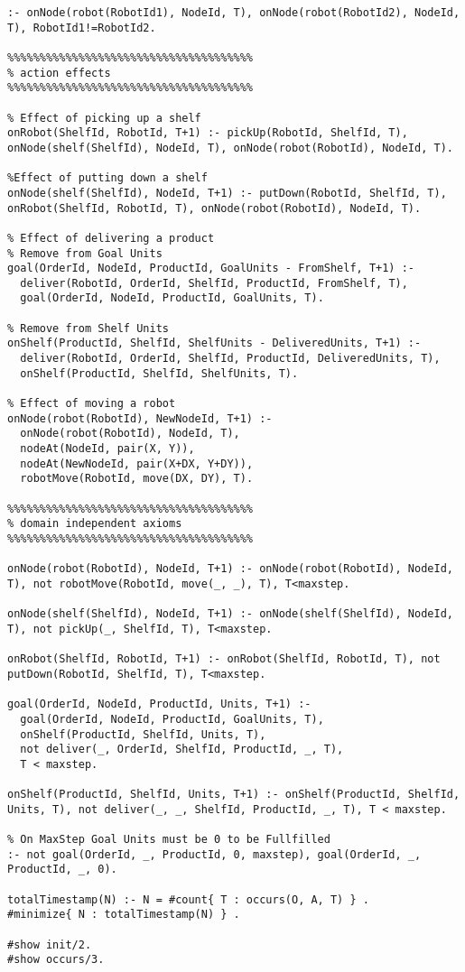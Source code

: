 \documentclass[letterpaper]{article} %
\begin{document}
\begin{lstlisting}[numbers=none,language=clingo]
% No 2 robots on the same node
:- onNode(robot(RobotId1), NodeId, T), onNode(robot(RobotId2), NodeId, T), RobotId1!=RobotId2.

%%%%%%%%%%%%%%%%%%%%%%%%%%%%%%%%%%%%%%
% action effects
%%%%%%%%%%%%%%%%%%%%%%%%%%%%%%%%%%%%%%

% Effect of picking up a shelf
onRobot(ShelfId, RobotId, T+1) :- pickUp(RobotId, ShelfId, T), onNode(shelf(ShelfId), NodeId, T), onNode(robot(RobotId), NodeId, T).

%Effect of putting down a shelf
onNode(shelf(ShelfId), NodeId, T+1) :- putDown(RobotId, ShelfId, T), onRobot(ShelfId, RobotId, T), onNode(robot(RobotId), NodeId, T).

% Effect of delivering a product
% Remove from Goal Units
goal(OrderId, NodeId, ProductId, GoalUnits - FromShelf, T+1) :-
  deliver(RobotId, OrderId, ShelfId, ProductId, FromShelf, T),
  goal(OrderId, NodeId, ProductId, GoalUnits, T).

% Remove from Shelf Units
onShelf(ProductId, ShelfId, ShelfUnits - DeliveredUnits, T+1) :- 
  deliver(RobotId, OrderId, ShelfId, ProductId, DeliveredUnits, T),
  onShelf(ProductId, ShelfId, ShelfUnits, T).

% Effect of moving a robot
onNode(robot(RobotId), NewNodeId, T+1) :-
  onNode(robot(RobotId), NodeId, T),
  nodeAt(NodeId, pair(X, Y)),
  nodeAt(NewNodeId, pair(X+DX, Y+DY)),
  robotMove(RobotId, move(DX, DY), T).

%%%%%%%%%%%%%%%%%%%%%%%%%%%%%%%%%%%%%%
% domain independent axioms
%%%%%%%%%%%%%%%%%%%%%%%%%%%%%%%%%%%%%%

onNode(robot(RobotId), NodeId, T+1) :- onNode(robot(RobotId), NodeId, T), not robotMove(RobotId, move(_, _), T), T<maxstep.

onNode(shelf(ShelfId), NodeId, T+1) :- onNode(shelf(ShelfId), NodeId, T), not pickUp(_, ShelfId, T), T<maxstep.

onRobot(ShelfId, RobotId, T+1) :- onRobot(ShelfId, RobotId, T), not putDown(RobotId, ShelfId, T), T<maxstep.

goal(OrderId, NodeId, ProductId, Units, T+1) :- 
  goal(OrderId, NodeId, ProductId, GoalUnits, T),
  onShelf(ProductId, ShelfId, Units, T),
  not deliver(_, OrderId, ShelfId, ProductId, _, T),
  T < maxstep.

onShelf(ProductId, ShelfId, Units, T+1) :- onShelf(ProductId, ShelfId, Units, T), not deliver(_, _, ShelfId, ProductId, _, T), T < maxstep.

% On MaxStep Goal Units must be 0 to be Fullfilled
:- not goal(OrderId, _, ProductId, 0, maxstep), goal(OrderId, _, ProductId, _, 0).

totalTimestamp(N) :- N = #count{ T : occurs(O, A, T) } .
#minimize{ N : totalTimestamp(N) } .

#show init/2.
#show occurs/3.
  \end{lstlisting}
\
\end{document}
